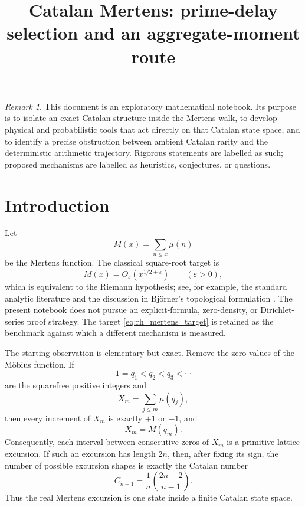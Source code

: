 \documentclass[11pt]{amsart}
\title[Catalan Mertens]{Catalan Mertens: prime-delay selection and an aggregate-moment route}
\author{}
\date{}
\numberwithin{equation}{section}
\theoremstyle{plain}
\theoremstyle{definition}
\theoremstyle{remark}
\newtheorem{remark}[theorem]{Remark}
\newcommand{\Mob}{\mu}
\newcommand{\Mert}{M}
\newcommand{\Cat}{C}
\newcommand{\eps}{\varepsilon}
\begin{document}
\maketitle
\tableofcontents
\bigskip

\begin{remark}
\label{rem:exploratory_nature}
This document is an exploratory mathematical notebook.  Its purpose is to isolate an exact Catalan structure inside the Mertens walk, to develop physical and probabilistic tools that act directly on that Catalan state space, and to identify a precise obstruction between ambient Catalan rarity and the deterministic arithmetic trajectory.  Rigorous statements are labelled as such; proposed mechanisms are labelled as heuristics, conjectures, or questions.
\end{remark}

\section{Introduction}
\label{sec:introduction}

Let
\begin{equation}
\Mert(x)=\sum_{n\le x}\Mob(n)
\label{eq:mertens_definition}
\end{equation}
be the Mertens function.  The classical square-root target is
\begin{equation}
\Mert(x)=O_{\eps}\!\left(x^{1/2+\eps}\right)
\qquad (\eps>0),
\label{eq:rh_mertens_target}
\end{equation}
which is equivalent to the Riemann hypothesis; see, for example, the standard analytic literature and the discussion in Bj\"orner's topological formulation \cite{Bjorner2011}.  The present notebook does not pursue an explicit-formula, zero-density, or Dirichlet-series proof strategy.  The target \eqref{eq:rh_mertens_target} is retained as the benchmark against which a different mechanism is measured.

The starting observation is elementary but exact.  Remove the zero values of the M\"obius function.  If
\begin{equation}
1=q_1<q_2<q_3<\cdots
\label{eq:squarefree_enumeration}
\end{equation}
are the squarefree positive integers and
\begin{equation}
X_m=\sum_{j\le m}\Mob(q_j),
\label{eq:compressed_walk}
\end{equation}
then every increment of $X_m$ is exactly $+1$ or $-1$, and
\begin{equation}
X_m=\Mert(q_m).
\label{eq:compressed_equals_mertens}
\end{equation}
Consequently, each interval between consecutive zeros of $X_m$ is a primitive lattice excursion.  If such an excursion has length $2n$, then, after fixing its sign, the number of possible excursion shapes is exactly the Catalan number
\begin{equation}
\Cat_{n-1}=\frac{1}{n}\binom{2n-2}{n-1}.
\label{eq:primitive_catalan_count_intro}
\end{equation}
Thus the real Mertens excursion is one state inside a finite Catalan state space.
\end{document}
